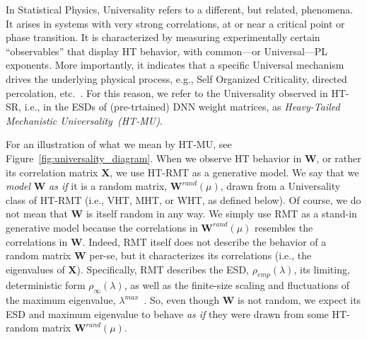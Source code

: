 In Statistical Physics, Universality refers to a different, but related, phenomena.
It arises in systems with very strong correlations, at or near a critical point or phase transition. 
It is characterized by measuring experimentally certain ``observables'' that display HT behavior, with common---or Universal---PL exponents. 
More importantly, it indicates that a specific Universal mechanism drives the underlying physical process, e.g., Self Organized Criticality, directed percolation, etc.~\cite{SornetteBook,BouchaudPotters03}. 
For this reason, we refer to the Universality observed in HT-SR, i.e., in the ESDs of (pre-trtained) DNN weight matrices, as \emph{Heavy-Tailed Mechanistic Universality~(HT-MU)}.

For an illustration of what we mean by HT-MU, see Figure~\ref{fig:universality_diagram}. 
When we observe HT behavior in $\mathbf{W}$, or rather its correlation matrix $\mathbf{X}$, we use HT-RMT as a generative model. 
We say that we \emph{model} $\mathbf{W}$ \emph{as if} it is a random matrix, $\mathbf{W}^{rand}(\mu)$, drawn from a Universality class of HT-RMT (i.e., VHT, MHT, or WHT, as defined below). 
Of course, we do not mean that $\mathbf{W}$ is itself random in any way.
We simply use RMT as a stand-in generative model because the correlations in $\mathbf{W}^{rand}(\mu)$ resembles the correlations in  $\mathbf{W}$. 
Indeed, RMT itself does not describe the behavior of a random matrix $\mathbf{W}$ per-se, but it characterizes its correlations (i.e., the eigenvalues of $\mathbf{X}$). 
Specifically, RMT describes the ESD, $\rho_{emp}(\lambda)$, its limiting, deterministic form $\rho_{\infty}(\lambda)$, as well as the finite-size scaling and fluctuations of the maximum eigenvalue, $\lambda^{max}$~\cite{MM18_TR}. 
So, even though $\mathbf{W}$ is not random, we expect its ESD and maximum eigenvalue to behave \emph{as if} they were drawn from some HT-random matrix $\mathbf{W}^{rand}(\mu)$.
   
 


